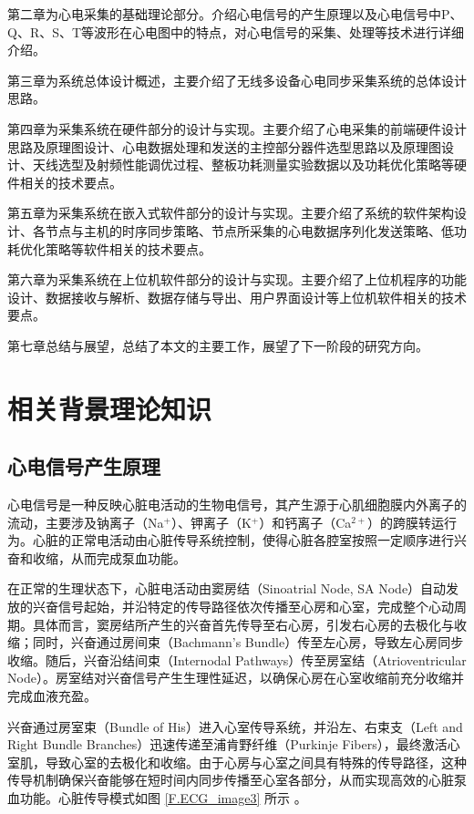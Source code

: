 第二章为心电采集的基础理论部分。介绍心电信号的产生原理以及心电信号中P、Q、R、S、T等波形在心电图中的特点，对心电信号的采集、处理等技术进行详细介绍。

第三章为系统总体设计概述，主要介绍了无线多设备心电同步采集系统的总体设计思路。

第四章为采集系统在硬件部分的设计与实现。主要介绍了心电采集的前端硬件设计思路及原理图设计、心电数据处理和发送的主控部分器件选型思路以及原理图设计、天线选型及射频性能调优过程、整板功耗测量实验数据以及功耗优化策略等硬件相关的技术要点。

第五章为采集系统在嵌入式软件部分的设计与实现。主要介绍了系统的软件架构设计、各节点与主机的时序同步策略、节点所采集的心电数据序列化发送策略、低功耗优化策略等软件相关的技术要点。

第六章为采集系统在上位机软件部分的设计与实现。主要介绍了上位机程序的功能设计、数据接收与解析、数据存储与导出、用户界面设计等上位机软件相关的技术要点。

第七章总结与展望，总结了本文的主要工作，展望了下一阶段的研究方向。

\newpage    %

\section{相关背景理论知识}

\subsection{心电信号产生原理}

心电信号是一种反映心脏电活动的生物电信号，其产生源于心肌细胞膜内外离子的流动，主要涉及钠离子（Na$^+$）、钾离子（K$^+$）和钙离子（Ca$^{2+}$）的跨膜转运行为。心脏的正常电活动由心脏传导系统控制，使得心脏各腔室按照一定顺序进行兴奋和收缩，从而完成泵血功能。

在正常的生理状态下，心脏电活动由窦房结（Sinoatrial Node, SA Node）自动发放的兴奋信号起始，并沿特定的传导路径依次传播至心房和心室，完成整个心动周期。具体而言，窦房结所产生的兴奋首先传导至右心房，引发右心房的去极化与收缩；同时，兴奋通过房间束（Bachmann’s Bundle）传至左心房，导致左心房同步收缩。随后，兴奋沿结间束（Internodal Pathways）传至房室结（Atrioventricular Node）。房室结对兴奋信号产生生理性延迟，以确保心房在心室收缩前充分收缩并完成血液充盈。

兴奋通过房室束（Bundle of His）进入心室传导系统，并沿左、右束支（Left and Right Bundle Branches）迅速传递至浦肯野纤维（Purkinje Fibers），最终激活心室肌，导致心室的去极化和收缩。由于心房与心室之间具有特殊的传导路径，这种传导机制确保兴奋能够在短时间内同步传播至心室各部分，从而实现高效的心脏泵血功能。心脏传导模式如图 \ref{F.ECG_image3} 所示 \cite{现代医学电子仪器原理与设计} 。


